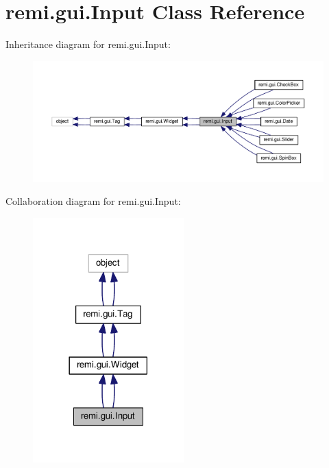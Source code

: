 \hypertarget{classremi_1_1gui_1_1Input}{}\section{remi.\+gui.\+Input Class Reference}
\label{classremi_1_1gui_1_1Input}


Inheritance diagram for remi.\+gui.\+Input\+:
\nopagebreak
\begin{figure}[H]
\begin{center}
\leavevmode
\includegraphics[width=350pt]{d1/d16/classremi_1_1gui_1_1Input__inherit__graph}
\end{center}
\end{figure}


Collaboration diagram for remi.\+gui.\+Input\+:
\nopagebreak
\begin{figure}[H]
\begin{center}
\leavevmode
\includegraphics[width=165pt]{d7/d88/classremi_1_1gui_1_1Input__coll__graph}
\end{center}
\end{figure}
